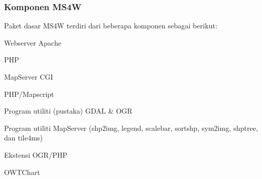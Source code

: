 \subsubsection{Komponen MS4W}
Paket dasar MS4W terdiri dari beberapa komponen sebagai berikut:
\item Webserver Apache
\item PHP
\item MapServer CGI
\item PHP/Mapscript
\item Program utiliti (pustaka) GDAL & OGR
\item Program utiliti MapServer (shp2img, legend, scalebar, sortshp, sym2img, shptree, dan tile4ms)
\item Ekstensi OGR/PHP
\item OWTChart

